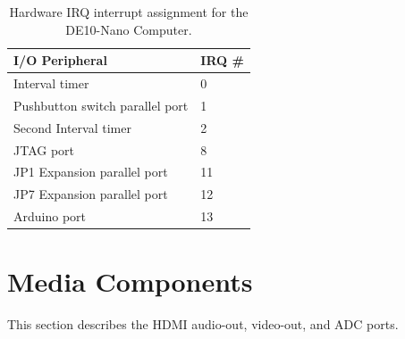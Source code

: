 \documentclass[11pt, twoside, pdftex]{article}
\newcommand{\commonFiles}{../../../common/doc}
\begin{document}
\begin{table}[h]
    \begin{center}
    \begin{tabular}{l|l}
            \textbf{I/O Peripheral} &
            \textbf{IRQ \#}
        \\\hline
            Interval timer & 0
        \\
            Pushbutton switch parallel port & 1
        \\
            Second Interval timer & 2
        \\
            JTAG port & 8
        \\
            JP1 Expansion parallel port & 11
        \\
            JP7 Expansion parallel port & 12
        \\
            Arduino port & 13
        \\
    \end{tabular}
    \caption{Hardware IRQ interrupt assignment for the DE10-Nano Computer.}
	 \label{tab:irq}
    \end{center}
\end{table}









\section{Media Components}
\label{sec:multi}

This section describes the HDMI audio-out, video-out, and ADC ports.





\newpage

\end{document}
